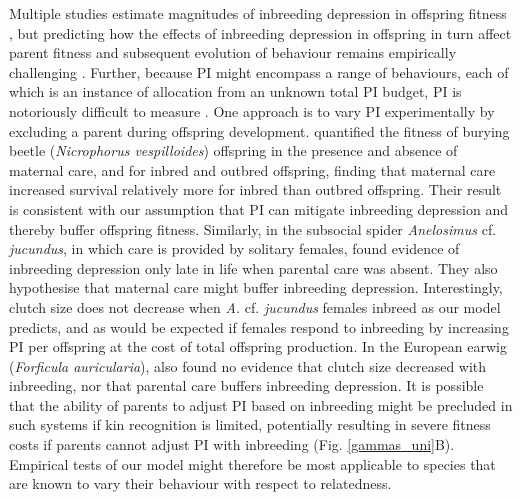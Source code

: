 \documentclass[12pt]{article}
\begin{document}
Multiple studies estimate magnitudes of inbreeding depression in offspring fitness \cite[][]{Charlesworth2009, Szulkin2012}, but predicting how the effects of inbreeding depression in offspring in turn affect parent fitness and subsequent evolution of behaviour remains empirically challenging \cite[][]{Reid2015b}. Further, because PI might encompass a range of behaviours, each of which is an instance of allocation from an unknown total PI budget, PI is notoriously difficult to measure \cite[][]{Parker2002}. One approach is to vary PI experimentally by excluding a parent during offspring development. \cite{Pilakouta2015} quantified the fitness of burying beetle (\textit{Nicrophorus vespilloides}) offspring in the presence and absence of maternal care, and for inbred and outbred offspring, finding that maternal care increased survival relatively more for inbred than outbred offspring. Their result is consistent with our assumption that PI can mitigate inbreeding depression and thereby buffer offspring fitness.  Similarly, in the subsocial spider \textit{Anelosimus} cf. \textit{jucundus}, in which care is provided by solitary females, \cite{Aviles2006} found evidence of inbreeding depression only late in life when parental care was absent. They also hypothesise that maternal care might buffer inbreeding depression. Interestingly, clutch size does not decrease when \textit{A.} cf. \textit{jucundus} females inbreed as our model predicts, and as would be expected if females respond to inbreeding by increasing PI per offspring at the cost of total offspring production. In the European earwig (\textit{Forficula auricularia}), \cite{Meunier2013} also found no evidence that clutch size decreased with inbreeding, nor that parental care buffers inbreeding depression. It is possible that the ability of parents to adjust PI based on inbreeding might be precluded in such systems if kin recognition is limited, potentially resulting in severe fitness costs if parents cannot adjust PI with inbreeding (Fig. \ref{gammas_uni}B). Empirical tests of our model might therefore be most applicable to species that are known to vary their behaviour with respect to relatedness.
\end{document}
